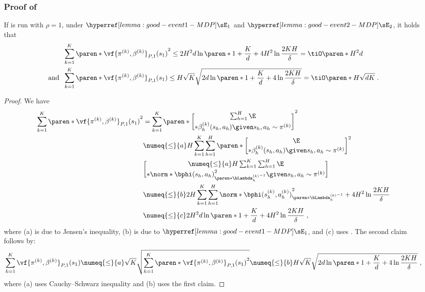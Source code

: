 \subsubsection{Proof of }
\begin{lemma}\label{lemma:elliptical-potential-MDP}
If  is run with $\rho = 1$, under $\rmvEevent$ and $\confevent$, it holds that
\begin{align*}
&\sum_{k=1}^K
\paren*{\vf{\pi^{(k)}, \beta^{(k)}}_{P, 1}(s_1)}^2   
\leq 2 H^2 d\ln\paren*{1 + \frac{K}{d}}+ 4 H^2 \ln \frac{2KH}{\delta}
= \tiO\paren*{H^2d}\\
\text{and }\;
&\sum_{k=1}^K
\paren*{\vf{\pi^{(k)}, \beta^{(k)}}_{P, 1}(s_1)} \leq 
H\sqrt{K}
\sqrt{
2 d\ln\paren*{1 + \frac{K}{d}}+ 4 \ln \frac{2KH}{\delta}
}
=\tiO\paren*{H\sqrt{d K}}\;.\\
\end{align*}
\end{lemma}
\begin{proof}
We have 
\begin{align*}
\sum_{k=1}^K
\paren*{\vf{\pi^{(k)}, \beta^{(k)}}_{P, 1}(s_1)}^2
&=
\sum_{k=1}^K
\paren*{
\sum_{h=1}^H
\E\brack*{\beta^{(k)}_h(s_h, a_h)\given s_h, a_h \sim \pi^{(k)}}}^2\\
&\numeq{\leq}{a}
H
\sum_{k=1}^K
\sum_{h=1}^H
\paren*{
\E\brack*{\beta^{(k)}_h(s_h, a_h)\given s_h, a_h \sim \pi^{(k)}}}^2\\
&\numeq{\leq}{a}
H \sum_{k=1}^K
\sum_{h=1}^H
\E\brack*{\norm*{\bphi(s_h, a_h)}^2_{\paren*{\bLambda_h^{(k)}}^{-1}}\given s_h, a_h \sim \pi^{(k)}}\\
&\numeq{\leq}{b}
2H\sum_{k=1}^K
\sum_{h=1}^H
\norm*{\bphi(s_h^{(k)}, a_h^{(k)})}^2_{\paren*{\bLambda_h^{(k)}}^{-1}}
+ 4 H^2\ln \frac{2KH}{\delta} \\
&\numeq{\leq}{c} 2 H^2 d\ln\paren*{1 + \frac{K}{d}}+ 4 H^2 \ln \frac{2KH}{\delta} \;,
\end{align*}
where (a) is due to Jensen's inequality, (b) is due to $\rmvEevent$, and (c) uses .   
The second claim follows by:
\begin{align*}
\sum_{k=1}^K  \vf{\pi^{(k)}, \beta^{(k)}}_{P, 1}(s_1)
\numeq{\leq}{a} \sqrt{K}\sqrt{\sum_{k=1}^K \paren*{\vf{\pi^{(k)}, \beta^{(k)}}_{P, 1}(s_1)}^2}
\numeq{\leq}{b} 
H\sqrt{K}
\sqrt{
2 d\ln\paren*{1 + \frac{K}{d}}+ 4 \ln \frac{2KH}{\delta}
}\;,
\end{align*}
where (a) uses Cauchy–Schwarz inequality and (b) uses the first claim.
\end{proof}

